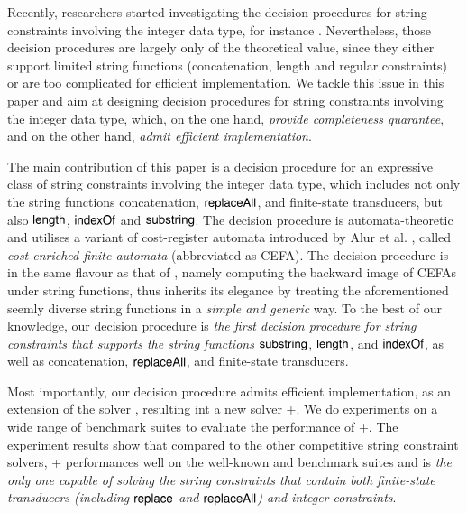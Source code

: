 Recently, researchers started investigating the decision procedures for string constraints involving the integer data type, for instance \cite{Vijay-length,L16,LinM18,LB16}. Nevertheless, those decision procedures are largely only of the theoretical value, since they either support limited string functions (concatenation, length and regular constraints) or are too complicated for efficient implementation. We tackle this issue in this paper and aim at designing decision procedures for string constraints involving the integer data type, which, on the one hand, \emph{provide completeness guarantee}, and on the other hand, \emph{admit efficient implementation}.

The main contribution of this paper is a decision procedure for an expressive class of string constraints involving the integer data type, which includes not only the string functions concatenation, $\mathsf{replaceAll}$, and finite-state transducers, but also $\mathsf{length}$, $\mathsf{indexOf}$ and $\mathsf{substring}$. The decision procedure is automata-theoretic and utilises a variant of cost-register automata introduced by Alur et al. \cite{RLJ+13}, called \emph{cost-enriched finite automata} (abbreviated as CEFA). The decision procedure is in the same flavour as that of {\ostrich} \cite{CHL+19}, namely computing the backward image of CEFAs under string functions, thus inherits its elegance by treating the aforementioned seemly diverse string functions in a \emph{simple and generic} way. To the best of our knowledge, our decision procedure is \emph{the first decision procedure for string constraints that supports the string functions} $\mathsf{substring}$, $\mathsf{length}$, and $\mathsf{indexOf}$, as well as concatenation, $\mathsf{replaceAll}$, and finite-state transducers. 

Most importantly, our decision procedure admits efficient implementation, as an extension of the {\ostrich} solver \cite{CHL+19}, resulting int a new solver {\ostrich}+.  We do experiments on a wide range of benchmark suites to evaluate the performance of {\ostrich}+. The experiment results show that compared to the other competitive string constraint solvers, {\ostrich}+ performances well on the well-known {\kaluzabench} and {\pyexbench} benchmark suites and is \emph{the only one capable of solving the string constraints that contain both finite-state transducers (including $\mathsf{replace}$ and $\mathsf{replaceAll}$) and integer constraints}.  



